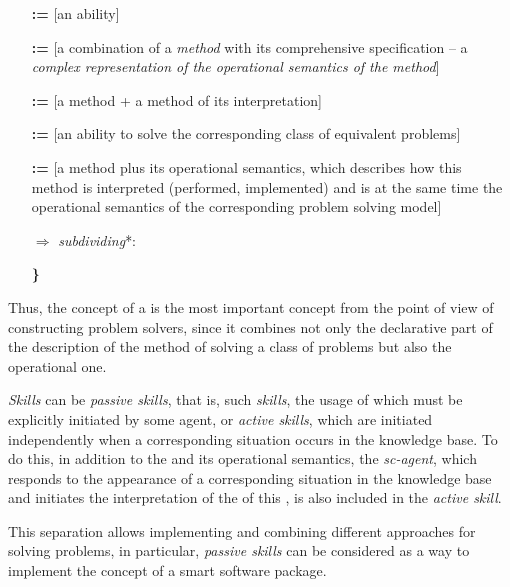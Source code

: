 \documentclass{report}
\begin{document}
\begin{multicols}{2}
\begin{itemize}[noitemsep]
    \item [\textbf{:=}] [an ability]
    \item [\textbf{:=}] [a combination of a \textit{method} with its comprehensive specification – a  \textit{complex representation of the operational semantics of the method}]
    \item [\textbf{:=}] [a method + a method of its interpretation]
    \item [\textbf{:=}] [an ability to solve the corresponding class of equivalent problems]
    \item [\textbf{:=}] [a method plus its operational semantics, which describes how this method is interpreted (performed, implemented) and is at the same time the operational semantics of the corresponding problem solving model]
    \item [$\Rightarrow$] \textit{subdividing}*:\\
    
    \textbf{\}}
\end{itemize}

Thus, the concept of a \skill is the most important
concept from the point of view of constructing problem
solvers, since it combines not only the declarative part
of the description of the method of solving a class of
problems but also the operational one.

\textit{Skills} can be \textit{passive skills}, that is, such \textit{skills}, the usage of which must be explicitly initiated by some agent, or \textit{active skills}, which are initiated independently when a corresponding situation occurs in the knowledge base. To do this, in addition to the \method and its operational semantics, the \textit{sc-agent}, which responds to the appearance of a corresponding situation in the knowledge base and initiates the interpretation of the \method of this \skill, is also included in the \textit{active skill}.

This separation allows implementing and combining different approaches for solving problems, in particular, \textit{passive skills} can be considered as a way to implement the concept of a smart software package.


\end{multicols}
\end{document}
